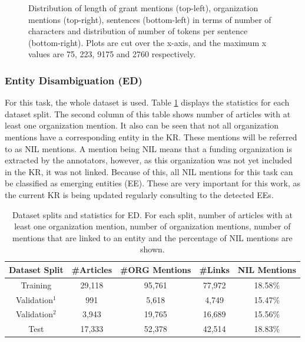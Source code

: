 \documentclass{report}
\theoremstyle{definition}
\theoremstyle{remark}
\begin{document}
\begin{figure}
    \caption{Distribution of length of grant mentions (top-left), organization mentions (top-right), sentences (bottom-left) in terms of number of characters and distribution of number of tokens per sentence (bottom-right). Plots are cut over the x-axis, and the maximum x values are 75, 223, 9175 and 2760 respectively.}
    \label{fig:nerdatalen}
\end{figure}

\subsubsection{Entity Disambiguation (ED)}
For this task, the whole dataset is used. Table \ref{tab:goldstatsed} displays the statistics for each dataset split. The second column of this table shows number of articles with at least one organization mention. It also can be seen that not all organization mentions have a corresponding entity in the KR. These mentions will be referred to as NIL mentions. A mention being NIL means that a funding organization is extracted by the annotators, however, as this organization was not yet included in the KR, it was not linked. Because of this, all NIL mentions for this task can be classified as emerging entities (EE). These are very important for this work, as the current KR is being updated regularly consulting to the detected EEs.

\begin{table}[h!]
    \centering
    \begin{tabular}{ccccc}
    Dataset Split & \#Articles & \#ORG Mentions & \#Links & NIL Mentions  \\
    \hline
    Training & 29,118 & 95,761 & 77,972 & 18.58\% \\
    Validation$^1$ & 991 & 5,618 & 4,749 & 15.47\% \\
    Validation$^2$ & 3,943 & 19,765 & 16,689 & 15.56\% \\
    Test & 17,333 & 52,378 & 42,514 & 18.83\% \\ 
    \end{tabular}
    \caption{Dataset splits and statistics for ED. For each split, number of articles with at least one organization mention, number of organization mentions, number of mentions that are linked to an entity and the percentage of NIL mentions are shown.}
    \label{tab:goldstatsed}
\end{table}
\end{document}
